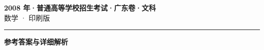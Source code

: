 \documentclass[zihao=5, a4paper]{ctexart}
\begin{document}
\begin{center}
  {\Large\bfseries 2008 年·普通高等学校招生考试·广东卷·文科}\\[4pt]
  {\large 数学 · 印刷版}
\end{center}
\medskip
{}

\par\bigskip\hrule\bigskip
{}
\begin{center}{\large\bfseries 参考答案与详细解析}\end{center}
\smallskip

\end{document}

